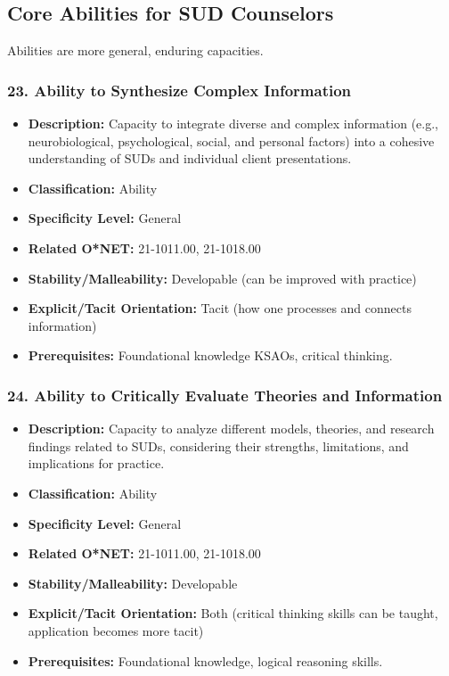 \documentclass[
  letterpaper,
  DIV=11,
  numbers=noendperiod]{scrartcl}
\providecommand{\tightlist}{%
  \setlength{\itemsep}{0pt}\setlength{\parskip}{0pt}}
\begin{document}
\subsection{Core Abilities for SUD
Counselors}\label{core-abilities-for-sud-counselors}

Abilities are more general, enduring capacities.

\subsubsection{23. Ability to Synthesize Complex
Information}\label{ability-to-synthesize-complex-information}

\begin{itemize}
\tightlist
\item
  \textbf{Description:} Capacity to integrate diverse and complex
  information (e.g., neurobiological, psychological, social, and
  personal factors) into a cohesive understanding of SUDs and individual
  client presentations.
\item
  \textbf{Classification:} Ability
\item
  \textbf{Specificity Level:} General
\item
  \textbf{Related O*NET:} 21-1011.00, 21-1018.00
\item
  \textbf{Stability/Malleability:} Developable (can be improved with
  practice)
\item
  \textbf{Explicit/Tacit Orientation:} Tacit (how one processes and
  connects information)
\item
  \textbf{Prerequisites:} Foundational knowledge KSAOs, critical
  thinking.
\end{itemize}

\subsubsection{24. Ability to Critically Evaluate Theories and
Information}\label{ability-to-critically-evaluate-theories-and-information}

\begin{itemize}
\tightlist
\item
  \textbf{Description:} Capacity to analyze different models, theories,
  and research findings related to SUDs, considering their strengths,
  limitations, and implications for practice.
\item
  \textbf{Classification:} Ability
\item
  \textbf{Specificity Level:} General
\item
  \textbf{Related O*NET:} 21-1011.00, 21-1018.00
\item
  \textbf{Stability/Malleability:} Developable
\item
  \textbf{Explicit/Tacit Orientation:} Both (critical thinking skills
  can be taught, application becomes more tacit)
\item
  \textbf{Prerequisites:} Foundational knowledge, logical reasoning
  skills.
\end{itemize}
\end{document}
